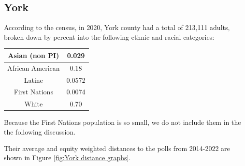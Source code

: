 \documentclass[11pt]{article}
\theoremstyle{remark}
\theoremstyle{definition}
\begin{document}
\subsection{York \label{sec:York distances}}
According to the census, in 2020, York county had a total of 213,111 adults, broken down by percent into the following ethnic and racial categories:

\begin{tabular} {| c | c |} 
\hline
 Asian (non PI) &  0.029 \\ \hline
African American & 0.18 \\ \hline
Latine & 0.0572 \\ \hline
First Nations & 0.0074 \\ \hline
White  & 0.70 \\ \hline
\end{tabular}

Because the First Nations population is so small, we do not include them in the the following discussion.

Their average and equity weighted distances to the polls from 2014-2022 are shown in Figure \ref{fig:York distance graphs}.
\end{document}
